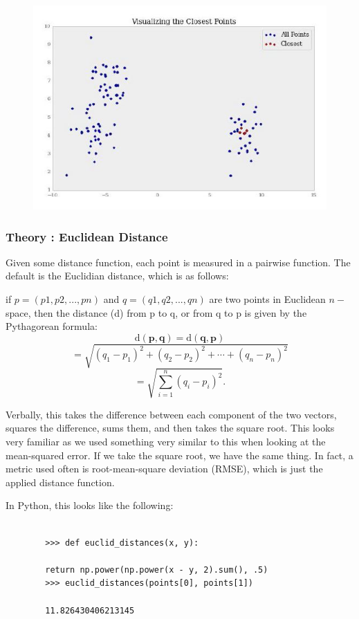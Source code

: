 \documentclass[SKL-MASTER.tex]{subfiles}
\begin{document}
	\begin{figure}
		\centering
		\includegraphics[width=0.8\linewidth]{SKL39-ClosestPoints}
		\caption{}
		\label{fig:SKL39-ClosestPoints}
	\end{figure}
	
	\newpage
	\subsubsection*{Theory : Euclidean Distance} %
	Given some distance function, each point is measured in a pairwise function. The default is
	the Euclidian distance, which is as follows:
	
	if $p = (p1, p2,..., pn)$ and $q = (q1, q2,..., qn)$ are two points in Euclidean $n-$space, then the distance (d) from p to q, or from q to p is given by the Pythagorean formula:
	\[\mathrm{d}(\mathbf{p},\mathbf{q}) = \mathrm{d}(\mathbf{q},\mathbf{p}) \]\[ = \sqrt{(q_1-p_1)^2 + (q_2-p_2)^2 + \cdots + (q_n-p_n)^2} \]
	\[ = \sqrt{\sum_{i=1}^n (q_i-p_i)^2}.\]
	
	Verbally, this takes the difference between each component of the two vectors, squares the
	difference, sums them, and then takes the square root. This looks very familiar as we used
	something very similar to this when looking at the mean-squared error. If we take the square
	root, we have the same thing. In fact, a metric used often is root-mean-square deviation
	(RMSE), which is just the applied distance function.
	
	In Python, this looks like the following:
	\begin{framed}
		\begin{verbatim}
		
		>>> def euclid_distances(x, y):
		
		return np.power(np.power(x - y, 2).sum(), .5)
		>>> euclid_distances(points[0], points[1])
		
		11.826430406213145
		\end{verbatim}
	\end{framed}
\end{document}
